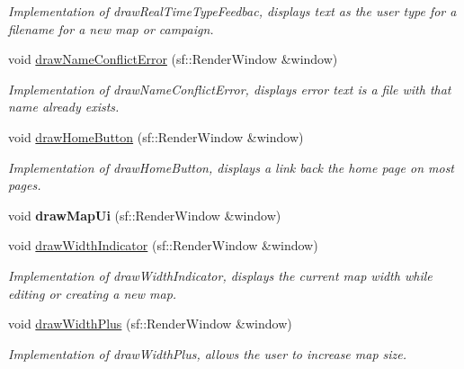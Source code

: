 \begin{DoxyCompactItemize}
\begin{DoxyCompactList}\small\item\em Implementation of draw\+Real\+Time\+Type\+Feedbac, displays text as the user type for a filename for a new map or campaign. \end{DoxyCompactList}\item 
\hypertarget{classUi_a647b268d78881db4a2871e5187e4ee6c}{}\label{classUi_a647b268d78881db4a2871e5187e4ee6c} 
void \hyperlink{classUi_a647b268d78881db4a2871e5187e4ee6c}{draw\+Name\+Conflict\+Error} (sf\+::\+Render\+Window \&window)
\begin{DoxyCompactList}\small\item\em Implementation of draw\+Name\+Conflict\+Error, displays error text is a file with that name already exists. \end{DoxyCompactList}\item 
\hypertarget{classUi_a81f4f16789c5862949453bc906d3757b}{}\label{classUi_a81f4f16789c5862949453bc906d3757b} 
void \hyperlink{classUi_a81f4f16789c5862949453bc906d3757b}{draw\+Home\+Button} (sf\+::\+Render\+Window \&window)
\begin{DoxyCompactList}\small\item\em Implementation of draw\+Home\+Button, displays a link back the home page on most pages. \end{DoxyCompactList}\item 
\hypertarget{classUi_a065dc3d2122e8a49ee33dc425218e475}{}\label{classUi_a065dc3d2122e8a49ee33dc425218e475} 
void {\bfseries draw\+Map\+Ui} (sf\+::\+Render\+Window \&window)
\item 
\hypertarget{classUi_a47311b87c534af827f0277559708028b}{}\label{classUi_a47311b87c534af827f0277559708028b} 
void \hyperlink{classUi_a47311b87c534af827f0277559708028b}{draw\+Width\+Indicator} (sf\+::\+Render\+Window \&window)
\begin{DoxyCompactList}\small\item\em Implementation of draw\+Width\+Indicator, displays the current map width while editing or creating a new map. \end{DoxyCompactList}\item 
\hypertarget{classUi_ac5b2dfa9fae6339adbdaeaeea5b05a45}{}\label{classUi_ac5b2dfa9fae6339adbdaeaeea5b05a45} 
void \hyperlink{classUi_ac5b2dfa9fae6339adbdaeaeea5b05a45}{draw\+Width\+Plus} (sf\+::\+Render\+Window \&window)
\begin{DoxyCompactList}\small\item\em Implementation of draw\+Width\+Plus, allows the user to increase map size. \end{DoxyCompactList}\item 

\end{DoxyCompactItemize}
